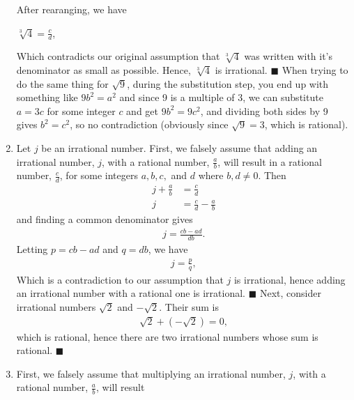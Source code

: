 \documentclass[12pt]{article}
\begin{document}
\begin{enumerate}
	      After rearanging, we have
	      \begin{center}
		      $\sqrt[3]{4} = \frac{c}{d}$,
	      \end{center}
	      Which contradicts our original assumption that $\sqrt[3]{4}$ was written with
	      it's denominator as small as possible. Hence, $\sqrt[3]{4}$ is irrational. \hfill $\blacksquare$
	      \newline
	      When trying to do the same thing for $\sqrt9$, during the substitution step,
	      you end up with something like $9b^2 = a^2$ and since 9 is a multiple of 3,
	      we can substitute $a = 3c$ for some integer $c$ and get $9b^2 = 9c^2$, and
	      dividing both sides by 9 gives $b^2 = c^2$, so no contradiction (obviously
	      since $\sqrt9 = 3$, which is rational).
	\item Let $j$ be an irrational number. First, we falsely assume that adding an
	      irrational number, $j$, with a rational number, $\frac{a}{b}$, will result
	      in a rational number, $\frac{c}{d}$, for some integers $a,b,c, $ and $d$
	      where $b, d \neq 0$. Then
	      \begin{align*}
		      j + \frac{a}{b} & = \frac{c}{d}               \\
		      j               & = \frac{c}{d} - \frac{a}{b}
	      \end{align*}
	      and finding a common denominator gives
	      \begin{align*}
		      j = \frac{cb-ad}{db}.
	      \end{align*}
	      Letting $p = cb-ad$ and $q = db$, we have
	      \begin{align*}
		      j = \frac{p}{q},
	      \end{align*}
	      Which is a contradiction to our assumption that $j$ is irrational, hence
	      adding an irrational number with a rational one is irrational. \hfill $\blacksquare$\newline\newline
	      Next, consider irrational numbers $\sqrt2$ and $-\sqrt2$. Their sum is
	      \begin{align*}
		      \sqrt2 + (-\sqrt2) = 0,
	      \end{align*}
	      which is rational, hence there are two irrational numbers whose sum is
	      rational. \hfill $\blacksquare$
	\item First, we falsely assume that multiplying an
	      irrational number, $j$, with a rational number, $\frac{a}{b}$, will result

\end{enumerate}
\end{document}

